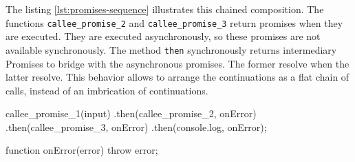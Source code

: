 




The listing \ref{lst:promises-sequence} illustrates this chained composition.
The functions \texttt{callee\_promise\_2} and \texttt{callee\_promise\_3} return promises when they are executed.
They are executed asynchronously, so these promises are not available synchronously.
The method \texttt{then} synchronously returns intermediary Promises to bridge with the asynchronous promises.
The former resolve when the latter resolve.
This behavior allows to arrange the continuations as a flat chain of calls, instead of an imbrication of continuations.

\begin{code}[js, %
             caption={Example of a chain of Promises}, %
             label={lst:promises-sequence}] %
callee_promise_1(input)
.then(callee_promise_2, onError)
.then(callee_promise_3, onError)
.then(console.log, onError);

function onError(error) {
  throw error;
}
\end{code}


